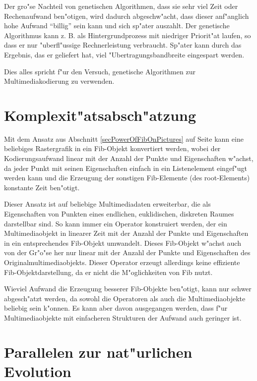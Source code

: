 Der gro"se Nachteil von genetischen Algorithmen, dass sie sehr viel Zeit oder Rechenaufwand ben"otigen, wird dadurch abgeschw"acht, dass dieser anf"anglich hohe Aufwand ``billig'' sein kann und sich sp"ater auszahlt. Der genetische Algorithmus kann z. B. als Hintergrundprozess mit niedriger Priorit"at laufen, so dass er nur "uberfl"ussige Rechnerleistung verbraucht. Sp"ater kann durch das Ergebnis, das er geliefert hat, viel "Ubertragungsbandbreite eingespart werden.

Dies alles spricht f"ur den Versuch, genetische Algorithmen zur Multimediakodierung zu verwenden.


\section{Komplexit"atsabsch"atzung}
\label{abschaet}

Mit dem Ansatz aus Abschnitt \ref{secPowerOfFibOnPictures} auf Seite \pageref{secPowerOfFibOnPictures} kann eine beliebiges Rastergrafik in ein Fib-Objekt konvertiert werden, wobei der Kodierungsaufwand linear mit der Anzahl der Punkte und Eigenschaften w"achst, da jeder Punkt mit seinen Eigenschaften einfach in ein Listenelement eingef"ugt werden kann und die Erzeugung der sonstigen Fib-Elemente (des root-Elements) konstante Zeit ben"otigt.

Dieser Ansatz ist auf beliebige Multimediadaten erweiterbar, die als Eigenschaften von Punkten eines endlichen, euklidischen, diskreten Raumes darstellbar sind. So kann immer ein Operator konstruiert werden, der ein Multimediaobjekt in linearer Zeit mit der Anzahl der Punkte und Eigenschaften in ein entsprechendes Fib-Objekt umwandelt. Dieses Fib-Objekt w"achst auch von der Gr"o"se her nur linear mit der Anzahl der Punkte und Eigenschaften des Originalmultimediaobjekts.
Dieser Operator erzeugt allerdings keine effiziente Fib-Objektdarstellung, da er nicht die M"oglichkeiten von Fib nutzt.

Wieviel Aufwand die Erzeugung besserer Fib-Objekte ben"otigt, kann nur schwer abgesch"atzt werden, da sowohl die Operatoren als auch die Multimediaobjekte beliebig sein k"onnen. Es kann aber davon ausgegangen werden, dass f"ur Multimediaobjekte mit einfacheren Strukturen der Aufwand auch geringer ist.


\section{Parallelen zur nat"urlichen Evolution}

